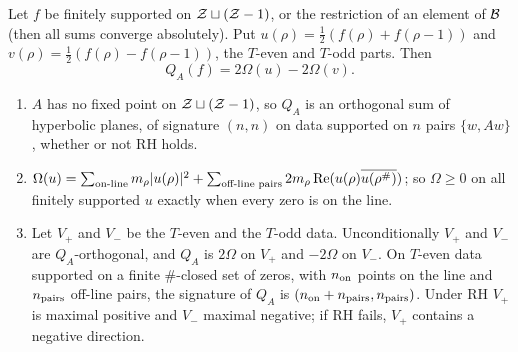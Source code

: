 \begin{proposition}\label{prop:chiral}
Let $f$ be finitely supported on $\mathcal{Z}\sqcup(\mathcal{Z}-1)$, or the restriction of an element of $\mathcal{B}$ (then all sums converge absolutely). Put $u(\rho)=\tfrac12(f(\rho)+f(\rho-1))$ and $v(\rho)=\tfrac12(f(\rho)-f(\rho-1))$, the $T$-even and $T$-odd parts. Then
\[
Q_A(f)=2\Omega(u)-2\Omega(v).
\]
\begin{enumerate}[label=(\alph*)]
\item $A$ has no fixed point on $\mathcal{Z}\sqcup(\mathcal{Z}-1)$, so $Q_A$ is an orthogonal sum of hyperbolic planes, of signature $(n,n)$ on data supported on $n$ pairs $\{w,Aw\}$, whether or not RH holds.
\item $\Omega(u)=\sum_{\text{on-line}}m_\rho|u(\rho)|^2+\sum_{\text{off-line pairs}}2m_\rho\operatorname{Re}(u(\rho)\overline{u(\rho^\#)})$; so $\Omega\ge0$ on all finitely supported $u$ exactly when every zero is on the line.
\item Let $V_+$ and $V_-$ be the $T$-even and the $T$-odd data. Unconditionally $V_+$ and $V_-$ are $Q_A$-orthogonal, and $Q_A$ is $2\Omega$ on $V_+$ and $-2\Omega$ on $V_-$. On $T$-even data supported on a finite $\#$-closed set of zeros, with $n_{\rm on}$ points on the line and $n_{\rm pairs}$ off-line pairs, the signature of $Q_A$ is $(n_{\rm on}+n_{\rm pairs},n_{\rm pairs})$. Under RH $V_+$ is maximal positive and $V_-$ maximal negative; if RH fails, $V_+$ contains a negative direction.
\end{enumerate}
\end{proposition}

